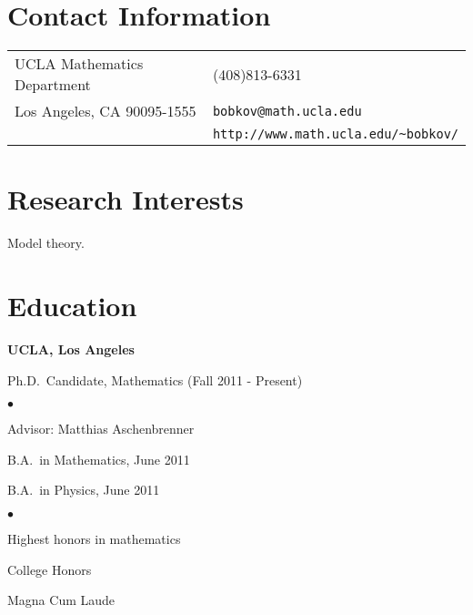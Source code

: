 \documentclass[margin,line,pifont,palatino,courier]{res}
\newenvironment{list1}{
  \begin{list}{\ding{113}}{%
      \setlength{\itemsep}{0in}
      \setlength{\parsep}{0in} \setlength{\parskip}{0in}
      \setlength{\topsep}{0in} \setlength{\partopsep}{0in}
      \setlength{\leftmargin}{0.17in}}}{\end{list}}
\newenvironment{list2}{
  \begin{list}{$\bullet$}{%
      \setlength{\itemsep}{0in}
      \setlength{\parsep}{0in} \setlength{\parskip}{0in}
      \setlength{\topsep}{0in} \setlength{\partopsep}{0in}
      \setlength{\leftmargin}{0.2in}}}{\end{list}}
\begin{document}

\begin{resume}

\section{\sc Contact Information}

\vspace{.05in}
\begin{tabular}{@{}p{2.75in}p{2in}}
UCLA Mathematics Department		& (408)813-6331 \\
Los Angeles, CA 90095-1555   	& \verb+bobkov@math.ucla.edu+\\
															& \verb+http://www.math.ucla.edu/~bobkov/+\\
\end{tabular}

\section{\sc Research Interests}
Model theory.

\section{\sc Education}

{\bf UCLA, Los Angeles}\\
\vspace*{-.1in}
\begin{list1}
\item[] Ph.D.~Candidate, Mathematics (Fall 2011 - Present)

\begin{list2}
\vspace*{.05in}
\item Advisor: Matthias Aschenbrenner
\end{list2}
\item[] B.A.~in Mathematics, June 2011
\item[] B.A.~in Physics, June 2011

\begin{list2}
\vspace*{.05in}
\item Highest honors in mathematics
\item College Honors
\item Magna Cum Laude
\end{list2}
\end{list1}


\end{resume}
\end{document}
